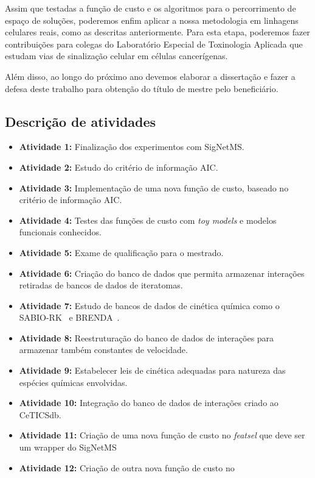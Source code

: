 \documentclass[12pt]{article}
\begin{document}
Assim que testadas a função de custo e os algoritmos para o 
percorrimento de espaço de soluções, poderemos enfim aplicar a nossa 
metodologia em linhagens celulares reais, como as descritas 
anteriormente. Para esta etapa, poderemos fazer contribuições para 
colegas do Laboratório Especial de Toxinologia Aplicada que estudam
vias de sinalização celular em células cancerígenas.

Além disso, ao longo do próximo ano devemos elaborar a dissertação e 
fazer a defesa deste trabalho para obtenção do título de mestre pelo
beneficiário.

\subsection{Descrição de atividades}
\begin{itemize}
    \item{\bf Atividade 1:} Finalização dos experimentos com SigNetMS.
    \item{\bf Atividade 2:} Estudo do critério de informação AIC.
    \item{\bf Atividade 3:} Implementação de uma nova função de custo,
        baseado no critério de informação AIC.
    \item{\bf Atividade 4:} Testes das funções de custo com 
        {\em toy models} e modelos funcionais conhecidos.
    \item{\bf Atividade 5:} Exame de qualificação para o mestrado.
    \item{\bf Atividade 6:} Criação do banco de dados que permita
        armazenar interações retiradas de bancos de dados de iteratomas.
    \item{\bf Atividade 7:} Estudo de bancos de dados de cinética 
        química como o SABIO-RK~\cite{doi:10.1093/nar/gkr1046} e 
        BRENDA~\cite{doi:10.1093/nar/gkh081}.
    \item{\bf Atividade 8:} Reestruturação do banco de dados de interações para 
        armazenar também constantes de velocidade.
    \item{\bf Atividade 9:} Estabelecer leis de cinética adequadas para natureza das
        espécies químicas envolvidas.
    \item{\bf Atividade 10:} Integração do banco de dados de interações 
        criado ao CeTICSdb.
    \item{\bf Atividade 11:} Criação de uma nova função de custo no 
        {\em featsel} que deve ser um wrapper do SigNetMS
    \item{\bf Atividade 12:} Criação de outra nova função de custo no

\end{itemize}
\end{document}
